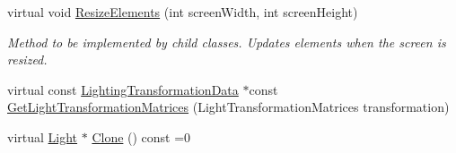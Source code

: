 \begin{DoxyCompactItemize}
\item 
\mbox{\label{class_geometry_engine_1_1_geometry_world_item_1_1_geometry_light_1_1_light_a18009ba6ef9c788f3d33d1ebd78a2140}} 
virtual void \mbox{\hyperlink{class_geometry_engine_1_1_geometry_world_item_1_1_geometry_light_1_1_light_a18009ba6ef9c788f3d33d1ebd78a2140}{Resize\+Elements}} (int screen\+Width, int screen\+Height)
\begin{DoxyCompactList}\small\item\em Method to be implemented by child classes. Updates elements when the screen is resized. \end{DoxyCompactList}\item 
virtual const \mbox{\hyperlink{class_geometry_engine_1_1_lighting_transformation_data}{Lighting\+Transformation\+Data}} $\ast$const \mbox{\hyperlink{class_geometry_engine_1_1_geometry_world_item_1_1_geometry_light_1_1_light_a332c999d4f704855683e079d99b563b2}{Get\+Light\+Transformation\+Matrices}} (Light\+Transformation\+Matrices transformation)
\item 
virtual \mbox{\hyperlink{class_geometry_engine_1_1_geometry_world_item_1_1_geometry_light_1_1_light}{Light}} $\ast$ \mbox{\hyperlink{class_geometry_engine_1_1_geometry_world_item_1_1_geometry_light_1_1_light_af367fa7201ad377a45fdc13e2002c518}{Clone}} () const =0
\end{DoxyCompactItemize}
